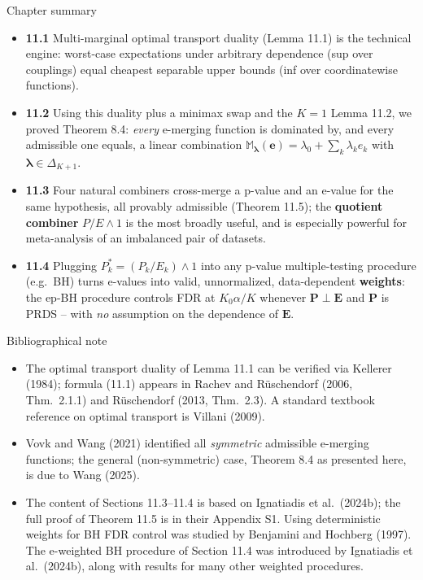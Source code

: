 \documentclass[aspectratio=169,10pt]{beamer}
\newcommand{\1}{\mathbb{1}}
\begin{document}
\begin{frame}[allowframebreaks]{Chapter summary}

\begin{itemize}
\item \textbf{11.1} Multi-marginal optimal transport duality (Lemma 11.1) is the technical engine: worst-case expectations under arbitrary dependence (sup over couplings) equal cheapest separable upper bounds (inf over coordinatewise functions).
\item \textbf{11.2} Using this duality plus a minimax swap and the $K=1$ Lemma 11.2, we proved Theorem 8.4: \emph{every} e-merging function is dominated by, and every admissible one equals, a linear combination $\mathbb M_{\boldsymbol\lambda}(\mathbf e) = \lambda_0+\sum_k\lambda_k e_k$ with $\boldsymbol\lambda\in\Delta_{K+1}$.
\item \textbf{11.3} Four natural combiners cross-merge a p-value and an e-value for the same hypothesis, all provably admissible (Theorem 11.5); the \textbf{quotient combiner} $P/E\wedge1$ is the most broadly useful, and is especially powerful for meta-analysis of an imbalanced pair of datasets.
\item \textbf{11.4} Plugging $P_k^*=(P_k/E_k)\wedge1$ into any p-value multiple-testing procedure (e.g.\ BH) turns e-values into valid, unnormalized, data-dependent \textbf{weights}: the ep-BH procedure controls FDR at $K_0\alpha/K$ whenever $\mathbf P\perp\mathbf E$ and $\mathbf P$ is PRDS -- with \emph{no} assumption on the dependence of $\mathbf E$.
\end{itemize}

\end{frame}

\begin{frame}[allowframebreaks]{Bibliographical note}

\begin{itemize}
\item The optimal transport duality of Lemma 11.1 can be verified via Kellerer (1984); formula (11.1) appears in Rachev and R\"uschendorf (2006, Thm.\ 2.1.1) and R\"uschendorf (2013, Thm.\ 2.3). A standard textbook reference on optimal transport is Villani (2009).
\item Vovk and Wang (2021) identified all \emph{symmetric} admissible e-merging functions; the general (non-symmetric) case, Theorem 8.4 as presented here, is due to Wang (2025).
\item The content of Sections 11.3--11.4 is based on Ignatiadis et al.\ (2024b); the full proof of Theorem 11.5 is in their Appendix S1. Using deterministic weights for BH FDR control was studied by Benjamini and Hochberg (1997). The e-weighted BH procedure of Section 11.4 was introduced by Ignatiadis et al.\ (2024b), along with results for many other weighted procedures.
\end{itemize}

\end{frame}
\end{document}
